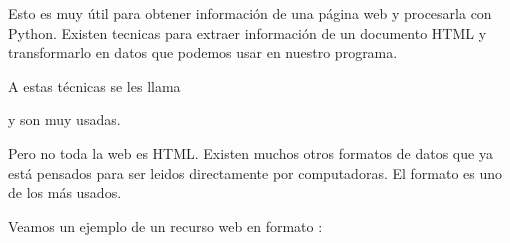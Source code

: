 \documentclass[a5paper,9pt,spanish]{sphinxmanual}
\begin{document}
\sphinxAtStartPar
Esto es muy útil para obtener información de una página web y procesarla
con Python. Existen tecnicas para extraer información de un documento HTML
y transformarlo en datos que podemos usar en nuestro programa.

\sphinxAtStartPar
A estas técnicas se les llama %
\begin{footnote}[36]\sphinxAtStartFootnote
{}
%
\end{footnote}
y son muy usadas.

\sphinxAtStartPar
Pero no toda la web es HTML. Existen muchos otros formatos de datos que
ya está pensados para ser leidos directamente por computadoras.
El formato  es uno de los más usados.

\sphinxAtStartPar
Veamos un ejemplo de un recurso web en formato :
\end{document}
